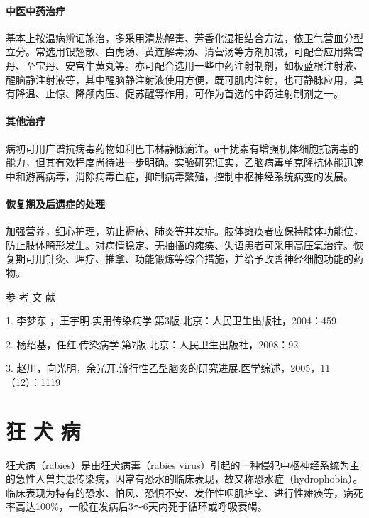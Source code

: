 \subsubsection{中医中药治疗}

基本上按温病辨证施治，多采用清热解毒、芳香化湿相结合方法，依卫气营血分型立分。常选用银翘散、白虎汤、黄连解毒汤、清营汤等方剂加减，可配合应用紫雪丹、至宝丹、安宫牛黄丸等。亦可配合选用一些中药注射制剂，如板蓝根注射液、醒脑静注射液等，其中醒脑静注射液使用方便，既可肌内注射，也可静脉应用，具有降温、止惊、降颅内压、促苏醒等作用，可作为首选的中药注射制剂之一。

\subsubsection{其他治疗}

病初可用广谱抗病毒药物如利巴韦林静脉滴注。α干扰素有增强机体细胞抗病毒的能力，但其有效程度尚待进一步明确。实验研究证实，乙脑病毒单克隆抗体能迅速中和游离病毒，消除病毒血症，抑制病毒繁殖，控制中枢神经系统病变的发展。

\subsubsection{恢复期及后遗症的处理}

加强营养，细心护理，防止褥疮、肺炎等并发症。肢体瘫痪者应保持肢体功能位，防止肢体畸形发生。对病情稳定、无抽搐的瘫痪、失语患者可采用高压氧治疗。恢复期可用针灸、理疗、推拿、功能锻炼等综合措施，并给予改善神经细胞功能的药物。

\protect\hypertarget{text00220.html}{}{}

\hypertarget{text00220.htmlux5cux23CHP7-5-5}{}
参 考 文 献

1. 李梦东 ，王宇明.实用传染病学.第3版.北京：人民卫生出版社，2004：459

2. 杨绍基，任红.传染病学.第7版.北京：人民卫生出版社，2008：92

3.
赵川，向光明，余光开.流行性乙型脑炎的研究进展.医学综述，2005，11（12）：1119

\protect\hypertarget{text00221.html}{}{}

\chapter{狂 犬 病}

狂犬病（rabies）是由狂犬病毒（rabies
virus）引起的一种侵犯中枢神经系统为主的急性人兽共患传染病，因常有恐水的临床表现，故又称恐水症（hydrophobia）。临床表现为特有的恐水、怕风、恐惧不安、发作性咽肌痉挛、进行性瘫痪等，病死率高达100\%，一般在发病后3～6天内死于循环或呼吸衰竭。

